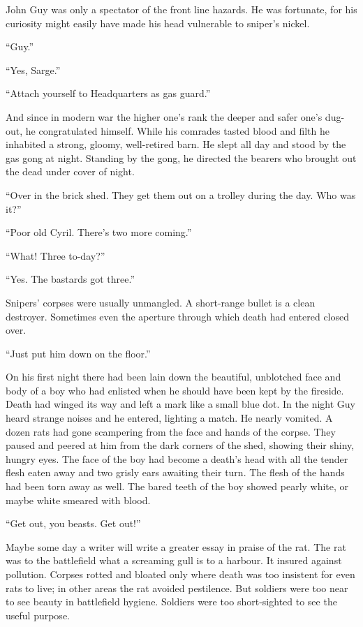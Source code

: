 John Guy was only a spectator of the front line hazards. He was fortunate, for his curiosity might easily have made his head vulnerable to sniper's nickel.

``Guy.''

``Yes, Sarge.''

``Attach yourself to Headquarters as gas guard.''

And since in modern war the higher one's rank the deeper and safer one's dug-out, he congratulated himself. While his comrades tasted blood and filth he inhabited a strong, gloomy, well-retired barn. He slept all day and stood by the gas gong at night. Standing by the gong, he directed the bearers who brought out the dead under cover of night.

``Over in the brick shed. They get them out on a trolley during the day. Who was it?''

``Poor old Cyril. There's two more coming.''

``What! Three to-day?''

``Yes. The bastards got three.''

Snipers' corpses were usually unmangled. A short-range bullet is a clean destroyer. Sometimes even the aperture through which death had entered closed over.

``Just put him down on the floor.''

On his first night there had been lain down the beautiful, unblotched face and body of a boy who had enlisted when he should have been kept by the fireside. Death had winged its way and left a mark like a small blue dot. In the night Guy heard strange noises and he entered, lighting a match. He nearly vomited. A dozen rats had gone scampering from the face and hands of the corpse. They paused and peered at him from the dark corners of the shed, showing their shiny, hungry eyes. The face of the boy had become a death's head with all the tender flesh eaten away and two grisly ears awaiting their turn. The flesh of the hands had been torn away as well. The bared teeth of the boy showed pearly white, or maybe white smeared with blood.

``Get out, you beasts. Get out!''

Maybe some day a writer will write a greater essay in praise of the rat. The rat was to the battlefield what a screaming gull is to a harbour. It insured against pollution. Corpses rotted and bloated only where death was too insistent for even rats to live; in other areas the rat avoided pestilence. But soldiers were too near to see beauty in battlefield hygiene. Soldiers were too short-sighted to see the useful purpose.

